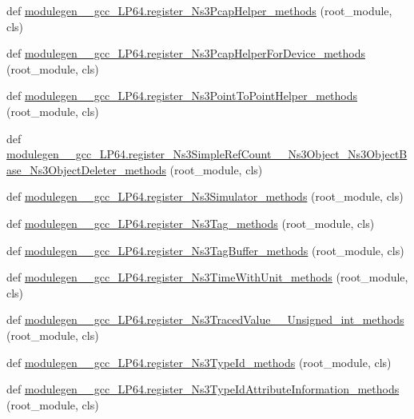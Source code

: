 \begin{DoxyCompactItemize}
\item 
def \hyperlink{namespacemodulegen____gcc__LP64_ad286cc7a6737b5e87b0793a24871902b}{modulegen\+\_\+\+\_\+gcc\+\_\+\+L\+P64.\+register\+\_\+\+Ns3\+Pcap\+Helper\+\_\+methods} (root\+\_\+module, cls)
\item 
def \hyperlink{namespacemodulegen____gcc__LP64_ac953f061a33acecaa39b9f1ba873ba21}{modulegen\+\_\+\+\_\+gcc\+\_\+\+L\+P64.\+register\+\_\+\+Ns3\+Pcap\+Helper\+For\+Device\+\_\+methods} (root\+\_\+module, cls)
\item 
def \hyperlink{namespacemodulegen____gcc__LP64_a26ad9470330fb5961e760b024b202b80}{modulegen\+\_\+\+\_\+gcc\+\_\+\+L\+P64.\+register\+\_\+\+Ns3\+Point\+To\+Point\+Helper\+\_\+methods} (root\+\_\+module, cls)
\item 
def \hyperlink{namespacemodulegen____gcc__LP64_a3df0bc75eda374a47e4888b021d60870}{modulegen\+\_\+\+\_\+gcc\+\_\+\+L\+P64.\+register\+\_\+\+Ns3\+Simple\+Ref\+Count\+\_\+\+\_\+\+Ns3\+Object\+\_\+\+Ns3\+Object\+Base\+\_\+\+Ns3\+Object\+Deleter\+\_\+methods} (root\+\_\+module, cls)
\item 
def \hyperlink{namespacemodulegen____gcc__LP64_ac43918825b198877acafaae4cbc1c9e0}{modulegen\+\_\+\+\_\+gcc\+\_\+\+L\+P64.\+register\+\_\+\+Ns3\+Simulator\+\_\+methods} (root\+\_\+module, cls)
\item 
def \hyperlink{namespacemodulegen____gcc__LP64_a8667a8c9dd38f2a77c66b6851250f1cb}{modulegen\+\_\+\+\_\+gcc\+\_\+\+L\+P64.\+register\+\_\+\+Ns3\+Tag\+\_\+methods} (root\+\_\+module, cls)
\item 
def \hyperlink{namespacemodulegen____gcc__LP64_a77191b364d09e6ccbe9b803bee493b0a}{modulegen\+\_\+\+\_\+gcc\+\_\+\+L\+P64.\+register\+\_\+\+Ns3\+Tag\+Buffer\+\_\+methods} (root\+\_\+module, cls)
\item 
def \hyperlink{namespacemodulegen____gcc__LP64_a054aa04457970b1c07a67d49cafee187}{modulegen\+\_\+\+\_\+gcc\+\_\+\+L\+P64.\+register\+\_\+\+Ns3\+Time\+With\+Unit\+\_\+methods} (root\+\_\+module, cls)
\item 
def \hyperlink{namespacemodulegen____gcc__LP64_af843944fc0315c1a343b30351d5dd3a5}{modulegen\+\_\+\+\_\+gcc\+\_\+\+L\+P64.\+register\+\_\+\+Ns3\+Traced\+Value\+\_\+\+\_\+\+Unsigned\+\_\+int\+\_\+methods} (root\+\_\+module, cls)
\item 
def \hyperlink{namespacemodulegen____gcc__LP64_adea84ddbc489895d2347d15ea1328bc0}{modulegen\+\_\+\+\_\+gcc\+\_\+\+L\+P64.\+register\+\_\+\+Ns3\+Type\+Id\+\_\+methods} (root\+\_\+module, cls)
\item 
def \hyperlink{namespacemodulegen____gcc__LP64_aae2764584a69687644f37b42586364df}{modulegen\+\_\+\+\_\+gcc\+\_\+\+L\+P64.\+register\+\_\+\+Ns3\+Type\+Id\+Attribute\+Information\+\_\+methods} (root\+\_\+module, cls)

\end{DoxyCompactItemize}
